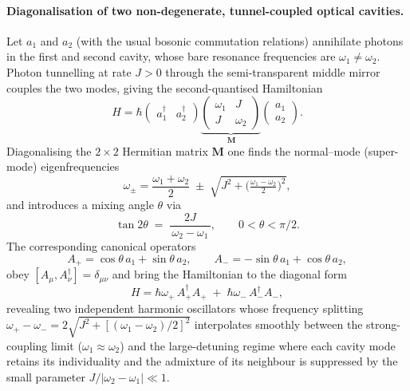\paragraph{Diagonalisation of two non-degenerate, tunnel-coupled optical cavities.}
Let \(a_{1}\) and \(a_{2}\) (with the usual bosonic commutation relations) annihilate photons in the first and second cavity, whose bare resonance frequencies are \(\omega_{1}\neq\omega_{2}\).  Photon tunnelling at rate \(J>0\) through the semi-transparent middle mirror couples the two modes, giving the second-quantised Hamiltonian
\[
H
  =\hbar
    \begin{pmatrix}
      a_{1}^{\dagger} & a_{2}^{\dagger}
    \end{pmatrix}
    \underbrace{\begin{pmatrix}
      \omega_{1} & J\\
      J          & \omega_{2}
    \end{pmatrix}}_{\,\mathbf M}
    \begin{pmatrix}
      a_{1}\\ a_{2}
    \end{pmatrix}.
\]
Diagonalising the \(2\times2\) Hermitian matrix \(\mathbf M\) one finds the normal–mode (super-mode) eigenfrequencies
\begin{equation}
\label{eq:split}
\omega_{\pm}= \frac{\omega_{1}+\omega_{2}}{2}\;\pm\;
              \sqrt{J^{2}+\bigl(\tfrac{\omega_{1}-\omega_{2}}{2}\bigr)^{2}},
\end{equation}
and introduces a mixing angle \(\theta\) via
\[
\tan 2\theta \;=\;\frac{2J}{\,\omega_{2}-\omega_{1}\,}, 
\qquad 0<\theta<\pi/2.
\]
The corresponding canonical operators
\[
A_{+}= \cos\theta\,a_{1}+\sin\theta\,a_{2},
\qquad
A_{-}=-\sin\theta\,a_{1}+\cos\theta\,a_{2},
\]
obey \([A_{\mu},A_{\nu}^{\dagger}]=\delta_{\mu\nu}\) and bring the Hamiltonian to the diagonal form
\[
H=\hbar\omega_{+}\,A_{+}^{\dagger}A_{+}\;+\;\hbar\omega_{-}\,A_{-}^{\dagger}A_{-},
\]
revealing two independent harmonic oscillators whose frequency splitting \(\omega_{+}-\omega_{-}=2\sqrt{J^{2}+[(\omega_{1}-\omega_{2})/2]^{2}}\) interpolates smoothly between the strong-coupling limit (\(\omega_{1}\approx\omega_{2}\)) and the large-detuning regime where each cavity mode retains its individuality and the admixture of its neighbour is suppressed by the small parameter \(J/|\omega_{2}-\omega_{1}|\ll1\).


